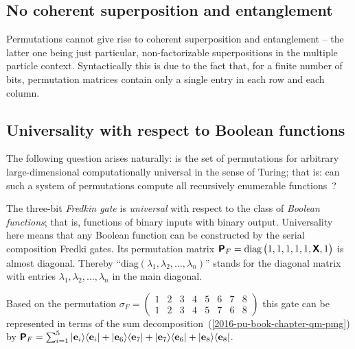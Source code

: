 \subsection{No coherent superposition and entanglement}

Permutations cannot give rise to coherent superposition and entanglement -- the latter one being just particular,
non-factorizable superpositions
in the multiple particle context.
Syntactically this is due to the fact that, for a finite number of bits, permutation matrices contain only a single entry in each row and each column.




\subsection{Universality with respect to Boolean functions}

The following question arises naturally: is the set of permutations for arbitrary large-dimensional computationally
universal in the sense of Turing; that is:
can such a system of permutations compute all recursively enumerable functions~\cite{bennett-73,toffoli77,fred-tof-82}?


The three-bit
{\em Fredkin gate}
is {\em universal} with respect to the class of
{\em Boolean functions};
that is, functions of binary inputs with binary output.
Universality here means that any Boolean function can be constructed by the serial composition Fredki gates.
Its permutation matrix
$\textsf{\textbf{P}}_F = \textrm{diag}\begin{pmatrix}1,1,1,1,1,\textsf{\textbf{X}},1\end{pmatrix}$ is almost diagonal.
Thereby ``$\textrm{diag} (\lambda_1 , \lambda_2 , \ldots , \lambda_n)$'' stands for the diagonal matrix with
entries $\lambda_1 , \lambda_2 , \ldots , \lambda_n$ in the main diagonal.

Based on the permutation $\sigma_F =  \begin{pmatrix}1&2&3&4&5&6&7&8 \\ 1&2&3&4&5&7&6&8\end{pmatrix}$
this gate can be represented in terms of the sum decomposition~(\ref{2016-pu-book-chapter-qm-pmg})
by $\textsf{\textbf{P}}_F =
\sum_{i=1}^5 \vert {\bf e}_i \rangle \langle {\bf e}_i \vert +
\vert {\bf e}_6 \rangle \langle {\bf e}_7 \vert +
\vert {\bf e}_7 \rangle \langle {\bf e}_6 \vert +
\vert {\bf e}_8 \rangle \langle {\bf e}_8 \vert
$.



